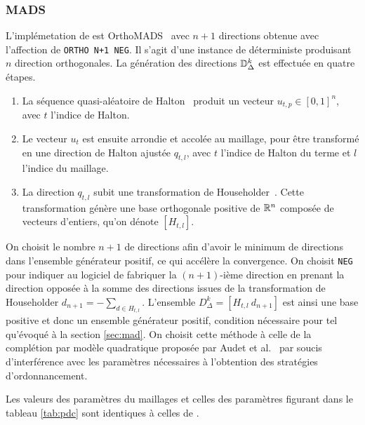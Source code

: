\subsubsection{MADS}\label{sec:nma}
L'implémetation de \MADS est \textsf{OrthoMADS}~\cite{AbAuDeLe09} avec $n+1$ directions obtenue avec l'affection de \texttt{ORTHO N+1 NEG}. Il s'agit d'une instance de \MADS déterministe produisant $n$ direction orthogonales. La génération des directions $\mathbb{D}_\Delta^k$ est effectuée en quatre étapes.
\begin{enumerate}[label=\roman*.]
\item La séquence quasi-aléatoire de Halton~\cite{Ha60} produit un vecteur $u_{t,p} \in [0,1]^n$, avec $t$ l'indice de Halton.
\item Le vecteur $u_{t}$ est ensuite arrondie et accolée au maillage, pour être transformé en une direction de Halton ajustée $q_{t,l}$, avec $t$ l'indice de Halton du terme et $l$ l'indice du maillage.
\item La direction $q_{t,l}$ subit une transformation de Householder~\cite{Ho58}. Cette transformation génère une base orthogonale positive de $\mathbb{R}^n$ composée de vecteurs d'entiers, qu'on dénote $[H_{t,l}]$.
\end{enumerate}
On choisit le nombre $n+1$ de directions afin d'avoir le minimum de directions dans l'ensemble générateur positif, ce qui accélère la convergence. On choisit \texttt{NEG} pour indiquer au logiciel de fabriquer la $(n+1)$-ième direction en prenant la direction opposée à la somme des directions issues de la transformation de Householder $d_{n+1}=-\sum_{d\in H_{t,l}}$. L'ensemble $D^k_\Delta = [H_{t,l}~d_{n+1}]$ est ainsi une base positive et donc un ensemble générateur positif, condition nécessaire pour \MADS tel qu'évoqué à la section \ref{sec:mad}. On choisit cette méthode à celle de la complétion par modèle quadratique proposée par Audet et al.~\cite{AuIaLeDTr2014} par soucis d'interférence avec les paramètres nécessaires à l'obtention des stratégies d'ordonnancement. 

Les valeurs des paramètres du maillages et celles des paramètres figurant dans le tableau \ref{tab:pdc} sont identiques à celles de \GPS.
